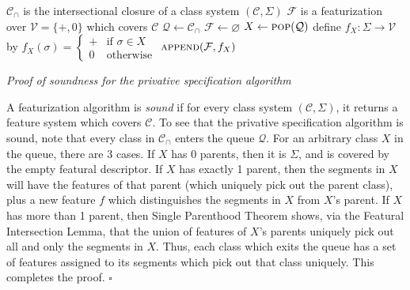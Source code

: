 \documentclass[11pt, oneside]{article}   	%
\begin{document}
\noindent \begin{algorithmic}
    \REQUIRE $\mathcal C_\cap$ is the intersectional closure of a class system $(\mathcal C, \Sigma)$
    \ENSURE $\mathcal F$ is a featurization over $\mathcal V = \{ +, 0 \}$ which covers $\mathcal C$
    \STATE
    \STATE $\mathcal Q \leftarrow \mathcal C_\cap$
    \STATE $\mathcal F \leftarrow \varnothing$
    \STATE
        \STATE $X \leftarrow \textsc{pop}(\mathcal Q)$
            \STATE define $f_X : \Sigma \rightarrow \mathcal V$ by $f_X(\sigma) = \begin{cases}
                + & \mbox{if } \sigma \in X \\
                0 & \mbox{otherwise}
                \end{cases} $
            \STATE $\textsc{append}(\mathcal F, f_X)$
        \ENDIF
    \ENDWHILE
\end{algorithmic}

\vspace{\baselineskip} \noindent \textit{Proof of soundness for the privative specification algorithm}

A featurization algorithm is \textit{sound} if for every class system $(\mathcal C, \Sigma)$, it returns a feature system which covers $\mathcal C$. To see that the privative specification algorithm is sound, note that every class in $\mathcal C_\cap$ enters the queue $\mathcal Q$. For an arbitrary class $X$ in the queue, there are 3 cases. If $X$ has 0 parents, then it is $\Sigma$, and is covered by the empty featural descriptor. If $X$ has exactly 1 parent, then the segments in $X$ will have the features of that parent (which uniquely pick out the parent class), plus a new feature $f$ which distinguishes the segments in $X$ from $X$'s parent. If $X$ has more than 1 parent, then Single Parenthood Theorem shows, via the Featural Intersection Lemma, that the union of features of $X$'s parents uniquely pick out all and only the segments in $X$. Thus, each class which exits the queue has a set of features assigned to its segments which pick out that class uniquely. This completes the proof. $\square$
\end{document}
